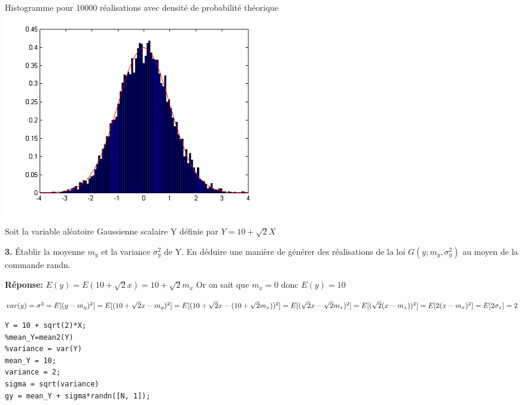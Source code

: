 \documentclass[12pt]{article}
\begin{document}
\begin{flushleft}
Histogramme pour 10000 réalisations avec densité de probabilité théorique
\includegraphics{1_2_10000.PNG}
\end{flushleft}
\smallbreak

Soit la variable aléatoire Gaussienne scalaire Y définie par $Y=10+\sqrt2 X$

\smallbreak

\textbf{3.} Établir la moyenne $m_y$ et la variance $\sigma_y^2$ de Y. En déduire une manière de générer des réalisations de la loi $G(y;m_y,\sigma_y^2)$ au moyen de la commande randn.

\smallbreak
\textbf{Réponse:}
$
E(y)=E(10+\sqrt2 x)=10 + \sqrt 2  m_x
$
Or on sait que $m_x=0$ donc $E(y)=10$
\smallbreak

\begin{math}
var(y)=\sigma ^2 \\
=E[(y-m_y)^2]\\
=E[(10+\sqrt 2 x -m_y)^2]\\
=E[(10+\sqrt 2 x -(10 + \sqrt 2  m_x))^2]\\
=E[(\sqrt 2 x -\sqrt 2  m_x)^2]\\
=E[(\sqrt 2(x -m_x))^2]\\
=E[2(x -m_x)^2]\\
=E[2 \sigma_x]\\
=2
\end{math}

\begin{lstlisting}[style=Matlab-editor]
Y = 10 + sqrt(2)*X;
%mean_Y=mean2(Y)
%variance = var(Y)
mean_Y = 10;
variance = 2;
sigma = sqrt(variance)
gy = mean_Y + sigma*randn([N, 1]);
\end{lstlisting}
\end{document}
